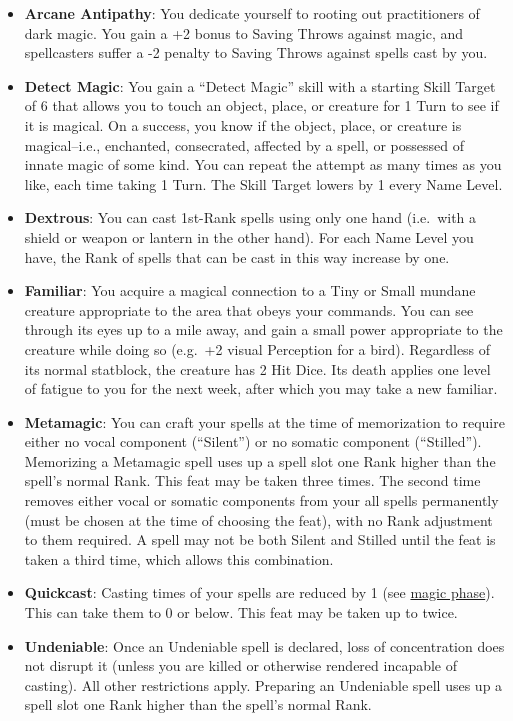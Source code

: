 \documentclass{book}
\providecommand{\tightlist}{%
\setlength{\itemsep}{0pt}\setlength{\parskip}{0pt}}
\begin{document}
\begin{itemize}
\tightlist
\item
  \textbf{Arcane Antipathy}: You dedicate yourself to rooting out
  practitioners of dark magic. You gain a +2 bonus to Saving Throws
  against magic, and spellcasters suffer a -2 penalty to Saving Throws
  against spells cast by you.
\item
  \textbf{Detect Magic}: You gain a ``Detect Magic'' skill with a
  starting Skill Target of 6 that allows you to touch an object, place,
  or creature for 1 Turn to see if it is magical. On a success, you know
  if the object, place, or creature is magical--i.e., enchanted,
  consecrated, affected by a spell, or possessed of innate magic of some
  kind. You can repeat the attempt as many times as you like, each time
  taking 1 Turn. The Skill Target lowers by 1 every Name Level.
\item
  \textbf{Dextrous}: You can cast 1st-Rank spells using only one hand
  (i.e.~with a shield or weapon or lantern in the other hand). For each
  Name Level you have, the Rank of spells that can be cast in this way
  increase by one.
\item
  \textbf{Familiar}: You acquire a magical connection to a Tiny or Small
  mundane creature appropriate to the area that obeys your commands. You
  can see through its eyes up to a mile away, and gain a small power
  appropriate to the creature while doing so (e.g.~+2 visual Perception
  for a bird). Regardless of its normal statblock, the creature has 2
  Hit Dice. Its death applies one level of fatigue to you for the next
  week, after which you may take a new familiar.
\item
  \textbf{Metamagic}: You can craft your spells at the time of
  memorization to require either no vocal component (``Silent'') or no
  somatic component (``Stilled''). Memorizing a Metamagic spell uses up
  a spell slot one Rank higher than the spell's normal Rank. This feat
  may be taken three times. The second time removes either vocal or
  somatic components from your all spells permanently (must be chosen at
  the time of choosing the feat), with no Rank adjustment to them
  required. A spell may not be both Silent and Stilled until the feat is
  taken a third time, which allows this combination.
\item
  \textbf{Quickcast}: Casting times of your spells are reduced by 1 (see
  \hyperref[combat-phases]{magic phase}). This can take them to 0 or
  below. This feat may be taken up to twice.
\item
  \textbf{Undeniable}: Once an Undeniable spell is declared, loss of
  concentration does not disrupt it (unless you are killed or otherwise
  rendered incapable of casting). All other restrictions apply.
  Preparing an Undeniable spell uses up a spell slot one Rank higher
  than the spell's normal Rank.
\end{itemize}
\end{document}
